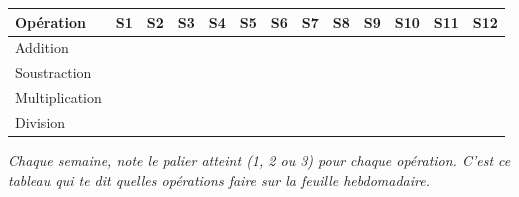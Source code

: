 \bigskip
\renewcommand{\arraystretch}{1.5}
\begin{tabularx}{\textwidth}{|l|*{12}{c|}}
\hline
\rowcolor{\themeColor!15}
\textbf{Opération} & S1 & S2 & S3 & S4 & S5 & S6 & S7 & S8 & S9 & S10 & S11 & S12 \\
\hline
Addition & & & & & & & & & & & & \\ \hline
Soustraction & & & & & & & & & & & & \\ \hline
Multiplication & & & & & & & & & & & & \\ \hline
Division & & & & & & & & & & & & \\ \hline
\end{tabularx}

\bigskip
\noindent \textit{Chaque semaine, note le palier atteint (1, 2 ou 3) pour chaque opération. C'est ce tableau qui te dit quelles opérations faire sur la feuille hebdomadaire.}	